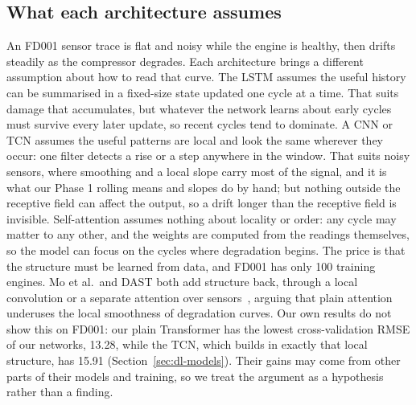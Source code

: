 \subsection{What each architecture assumes}
An FD001 sensor trace is flat and noisy while the engine is healthy, then
drifts steadily as the compressor degrades. Each architecture brings a
different assumption about how to read that curve. The LSTM assumes the
useful history can be summarised in a fixed-size state updated one cycle at
a time. That suits damage that accumulates, but whatever the network learns
about early cycles must survive every later update, so recent cycles tend to
dominate. A CNN or TCN assumes the useful patterns are local and look the
same wherever they occur: one filter detects a rise or a step anywhere in
the window. That suits noisy sensors, where smoothing and a local slope carry
most of the signal, and it is what our Phase 1 rolling means and slopes do
by hand; but nothing outside the receptive field can affect the output, so
a drift longer than the receptive field is invisible. Self-attention assumes
nothing about locality or order: any cycle may matter to any other, and
the weights are computed from the readings themselves, so the model can
focus on the cycles where degradation begins. The price is that the
structure must be learned from data, and FD001 has only 100 training
engines. Mo et al.\ and DAST both add structure back, through a local
convolution or a separate attention over sensors~\cite{mo2021gcu,
zhang2022dast}, arguing that plain attention underuses the local
smoothness of degradation curves. Our own results do not show this on
FD001: our plain Transformer has the lowest cross-validation RMSE of our
networks, 13.28, while the TCN, which builds in exactly that local
structure, has 15.91 (Section~\ref{sec:dl-models}). Their gains may come
from other parts of their models and training, so we treat the argument as
a hypothesis rather than a finding.

